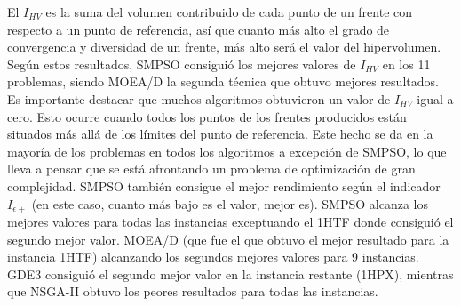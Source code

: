 
El $I_{HV}$ es la suma del volumen contribuido de cada punto de un frente con respecto a un punto de referencia, así que cuanto más alto el grado de convergencia y diversidad de un frente, más alto será el valor del hipervolumen. Según estos resultados, SMPSO consiguió los mejores valores de $I_{HV}$ en los 11 problemas, siendo MOEA/D la segunda técnica que obtuvo mejores resultados. Es importante destacar que muchos algoritmos obtuvieron un valor de $I_{HV}$ igual a cero. Esto ocurre cuando todos los puntos de los frentes producidos están situados más allá de los límites del punto de referencia. Este hecho se da en la mayoría de los problemas en todos los algoritmos a excepción de SMPSO, lo que lleva a pensar que se está afrontando un problema de optimización de gran complejidad. SMPSO también consigue el mejor rendimiento según el indicador $I_{\epsilon+}$ (en este caso, cuanto más bajo es el valor, mejor es). SMPSO alcanza los mejores valores para todas las  instancias exceptuando el 1HTF donde consiguió el segundo mejor valor. MOEA/D (que fue el que obtuvo el mejor resultado para la instancia 1HTF) alcanzando los segundos mejores valores para 9 instancias. GDE3 consiguió el segundo mejor valor en la instancia restante (1HPX), mientras que NSGA-II obtuvo los peores resultados para todas las instancias.

